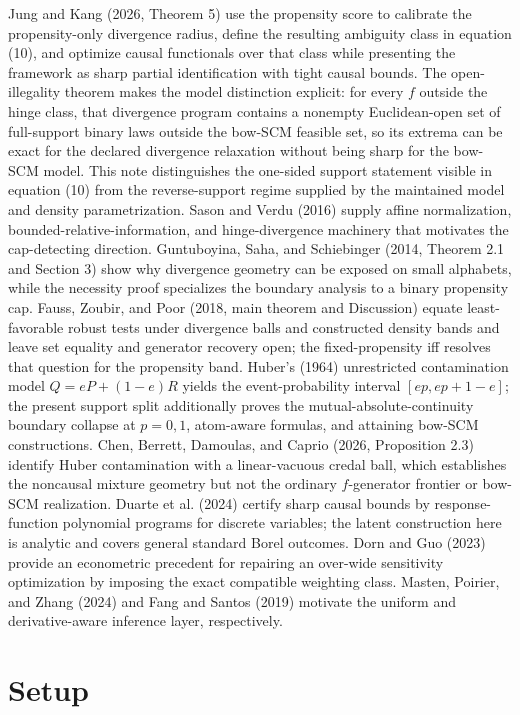 \documentclass{article}
\begin{document}
Jung and Kang (2026, Theorem 5) use the propensity score to calibrate the propensity-only divergence radius, define the resulting ambiguity class in equation (10), and optimize causal functionals over that class while presenting the framework as sharp partial identification with tight causal bounds. The open-illegality theorem makes the model distinction explicit: for every \(f\) outside the hinge class, that divergence program contains a nonempty Euclidean-open set of full-support binary laws outside the bow-SCM feasible set, so its extrema can be exact for the declared divergence relaxation without being sharp for the bow-SCM model. This note distinguishes the one-sided support statement visible in equation (10) from the reverse-support regime supplied by the maintained model and density parametrization. Sason and Verdu (2016) supply affine normalization, bounded-relative-information, and hinge-divergence machinery that motivates the cap-detecting direction. Guntuboyina, Saha, and Schiebinger (2014, Theorem 2.1 and Section 3) show why divergence geometry can be exposed on small alphabets, while the necessity proof specializes the boundary analysis to a binary propensity cap. Fauss, Zoubir, and Poor (2018, main theorem and Discussion) equate least-favorable robust tests under divergence balls and constructed density bands and leave set equality and generator recovery open; the fixed-propensity iff resolves that question for the propensity band. Huber's (1964) unrestricted contamination model \(Q=eP+(1-e)R\) yields the event-probability interval \([ep,ep+1-e]\); the present support split additionally proves the mutual-absolute-continuity boundary collapse at \(p=0,1\), atom-aware formulas, and attaining bow-SCM constructions. Chen, Berrett, Damoulas, and Caprio (2026, Proposition 2.3) identify Huber contamination with a linear-vacuous credal ball, which establishes the noncausal mixture geometry but not the ordinary \(f\)-generator frontier or bow-SCM realization. Duarte et al. (2024) certify sharp causal bounds by response-function polynomial programs for discrete variables; the latent construction here is analytic and covers general standard Borel outcomes. Dorn and Guo (2023) provide an econometric precedent for repairing an over-wide sensitivity optimization by imposing the exact compatible weighting class. Masten, Poirier, and Zhang (2024) and Fang and Santos (2019) motivate the uniform and derivative-aware inference layer, respectively.

\section{Setup}
\end{document}
